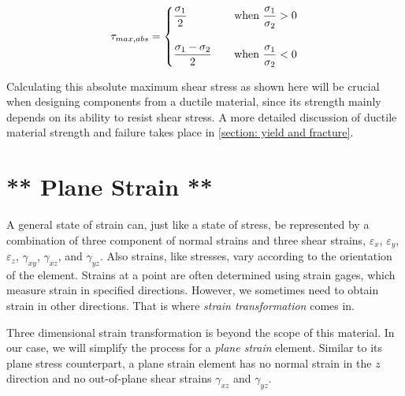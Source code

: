 \documentclass[
10pt,
a4paper,
openany,
svgnames,
]{kaobook} %
\begin{document}
\begin{equation}
  \tau_{max,abs} = \left\{
    \begin{gathered}
      \dfrac{\sigma_1}{2} \hspace{1.5cm} \text{when } \dfrac{\sigma_1}{\sigma_2} > 0 \\[10pt]
      \dfrac{\sigma_1 - \sigma_2}{2} \hfill \text{when } \dfrac{\sigma_1}{\sigma_2} < 0
    \end{gathered}
  \right.
\end{equation}

Calculating this absolute maximum shear stress as shown here will be crucial when designing components from a ductile material, since its strength mainly depends on its ability to resist shear stress. A more detailed discussion of ductile material strength and failure takes place in \cref{section: yield and fracture}.

\section{** Plane Strain **}

A general state of strain can, just like a state of stress, be represented by a combination of three component of normal strains and three shear strains, $\varepsilon_x$, $\varepsilon_y$, $\varepsilon_z$, $\gamma_{xy}$, $\gamma_{xz}$, and $\gamma_{yz}$. Also strains, like stresses, vary according to the orientation of the element. Strains at a point are often determined using strain gages, which measure strain in specified directions. However, we sometimes need to obtain strain in other directions. That is where \emph{strain transformation} comes in.

Three dimensional strain transformation is beyond the scope of this material. In our case, we will simplify the process for a \emph{plane strain} element. Similar to its plane stress counterpart, a plane strain element has no normal strain in the $z$ direction and no out-of-plane shear strains $\gamma_{xz}$ and $\gamma_{yz}$.
\end{document}
